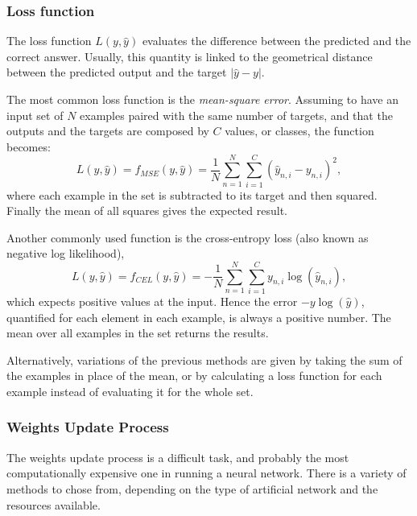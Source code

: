 \subsubsection{Loss function}
\label{sssec:Loss_function}
The loss function $L(y, \hat{y})$ evaluates the difference between the predicted and the correct answer.
Usually, this quantity is linked to the geometrical distance between the predicted output and the target $\left| \hat{y}-y \right|$.

The most common loss function is the \textit{mean-square error}.
Assuming to have an input set of $N$ examples paired with the same number of targets, and that the outputs and the targets are composed by $C$ values, or classes, the function becomes:
\begin{equation}
	L(y, \hat{y}) = f_{MSE}(y, \hat{y}) = \frac{1}{N} \sum_{n=1}^N \sum_{i=1}^C \left( \hat{y}_{n,i} - y_{n,i} \right)^2,
\end{equation}
where each example in the set is subtracted to its target and then squared.
Finally the mean of all squares gives the expected result.

Another commonly used function is the cross-entropy loss (also known as negative log likelihood),
\begin{equation}
	L(y, \hat{y}) = f_{CEL}(y, \hat{y}) = - \frac{1}{N} \sum_{n=1}^N \sum_{i=1}^C y_{n,i} \log \left( \hat{y}_{n,i} \right),
\end{equation}
which expects positive values at the input.
Hence the error $-y\log \left( \hat{y} \right)$, quantified for each element in each example, is always a positive number.
The mean over all examples in the set returns the results.

Alternatively, variations of the previous methods are given by taking the sum of the examples in place of the mean, or by calculating a loss function for each example instead of evaluating it for the whole set.

\subsubsection{Weights Update Process}
\label{sssec:Weights_Update_Process}

The weights update process is a difficult task, and probably the most computationally expensive one in running a neural network.
There is a variety of methods to chose from, depending on the type of artificial network and the resources available.

